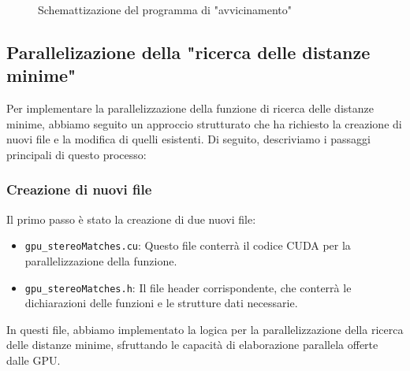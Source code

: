\documentclass[12pt,a4paper]{report}
\begin{document}
\begin{figure}[H]
    \centering
    \caption{Schemattizazione del programma di "avvicinamento"}
\end{figure}

\vspace{2cm}

\subsection{Parallelizazione della "ricerca delle distanze minime" } \label{distanze-minime-gpu}

Per implementare la parallelizzazione della funzione di ricerca delle distanze minime, abbiamo seguito un approccio strutturato che ha richiesto la creazione di nuovi file e la modifica di quelli esistenti. Di seguito, descriviamo i passaggi principali di questo processo:

\subsubsection{Creazione di nuovi file}
Il primo passo è stato la creazione di due nuovi file:

\begin{itemize}
    \item \texttt{gpu\_stereoMatches.cu}: Questo file conterrà il codice CUDA per la parallelizzazione della funzione.
    \item \texttt{gpu\_stereoMatches.h}: Il file header corrispondente, che conterrà le dichiarazioni delle funzioni e le strutture dati necessarie.
\end{itemize}

In questi file, abbiamo implementato la logica per la parallelizzazione della ricerca delle distanze minime, sfruttando le capacità di elaborazione parallela offerte dalle GPU.
\end{document}
